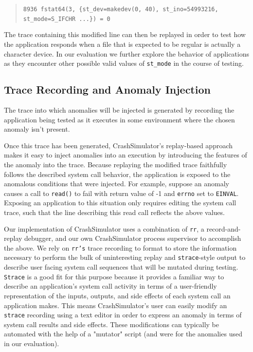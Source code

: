 \begin{quote}
  {\tt 8936  fstat64(3, \{st\_dev=makedev(0, 40), st\_ino=54993216, st\_mode=S\_IFCHR ...\}) = 0}
\end{quote}

The trace containing this modified line can then be replayed in order to
test how the application responds when a file that is expected to be
regular is actually a character device. In our evaluation we further
explore the behavior of applications as they encounter other possible valid
values of {\tt st\_mode} in the course of testing.


\subsection{Trace Recording and Anomaly Injection}

The trace into which anomalies will be injected is generated by recording
the application being tested as it executes in some environment where the
chosen anomaly isn't present.

Once this trace has been generated, CrashSimulator's replay-based approach
makes it easy to inject anomalies into an execution by introducing the
features of the anomaly into the trace.  Because replaying the modified
trace faithfully follows the described system call behavior, the
application is exposed to the anomalous conditions that were injected.  For
example, suppose an anomaly causes a call to {\tt read()} to fail with
return value of -1 and {\tt errno} set to {\tt EINVAL}.  Exposing an
application to this situation only requires editing the system call trace,
such that the line describing this read call reflects the above values.

Our implementation of CrashSimulator uses a combination of {\tt rr}, a
record-and-replay debugger, and our own CrashSimulator process supervisor
to accomplish the above.  We rely on {\tt rr's} trace recording to format
to store the information necessary to perform the bulk of uninteresting
replay and {\tt strace}-style output to describe user facing system call
sequences that will be mutated during testing.  {\tt Strace} is a good fit
for this purpose because it provides a familiar way to describe an
application's system call activity in terms of a user-friendly
representation of the inputs, outputs, and side effects of each system call
an application makes.  This means CrashSimulator's user can easily modify
an {\tt strace} recording using a text editor in order to express an
anomaly in terms of system call results and side effects.  These
modifications can typically be automated with the help of a "mutator"
script (and were for the anomalies used in our evaluation).

